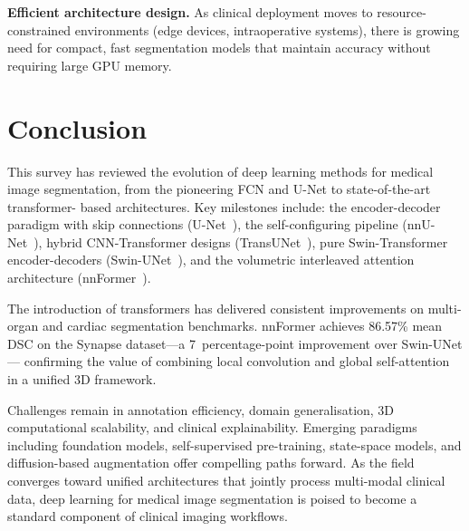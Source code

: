 \documentclass[preprint,12pt,authoryear]{elsarticle}
\begin{document}
\textbf{Efficient architecture design.} As clinical deployment moves to
resource-constrained environments (edge devices, intraoperative systems), there
is growing need for compact, fast segmentation models that maintain accuracy
without requiring large GPU memory.

\section{Conclusion}
\label{sec:conclusion}

This survey has reviewed the evolution of deep learning methods for medical image
segmentation, from the pioneering FCN and U-Net to state-of-the-art transformer-
based architectures. Key milestones include: the encoder-decoder paradigm with
skip connections (U-Net~\citep{ronneberger2015unet}), the self-configuring
pipeline (nnU-Net~\citep{isensee2021nnunet}), hybrid CNN-Transformer designs
(TransUNet~\citep{chen2021transunet}), pure Swin-Transformer encoder-decoders
(Swin-UNet~\citep{cao2022swinunet}), and the volumetric interleaved attention
architecture (nnFormer~\citep{zhou2023nnformer}).

The introduction of transformers has delivered consistent improvements on multi-
organ and cardiac segmentation benchmarks. nnFormer achieves 86.57\% mean DSC
on the Synapse dataset---a 7~percentage-point improvement over Swin-UNet---
confirming the value of combining local convolution and global self-attention
in a unified 3D framework.

Challenges remain in annotation efficiency, domain generalisation, 3D
computational scalability, and clinical explainability. Emerging paradigms
including foundation models, self-supervised pre-training, state-space models,
and diffusion-based augmentation offer compelling paths forward. As the field
converges toward unified architectures that jointly process multi-modal clinical
data, deep learning for medical image segmentation is poised to become a
standard component of clinical imaging workflows.



\end{document}
